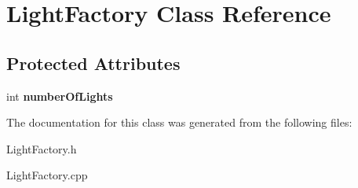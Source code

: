 \hypertarget{class_light_factory}{
\section{LightFactory Class Reference}
\label{class_light_factory}
}
\subsection*{Protected Attributes}
\begin{DoxyCompactItemize}
\item 
\hypertarget{class_light_factory_a7f4e30200f477d6dff387f0ff172fa4c}{
int {\bfseries numberOfLights}}
\label{class_light_factory_a7f4e30200f477d6dff387f0ff172fa4c}

\end{DoxyCompactItemize}


The documentation for this class was generated from the following files:\begin{DoxyCompactItemize}
\item 
LightFactory.h\item 
LightFactory.cpp\end{DoxyCompactItemize}
